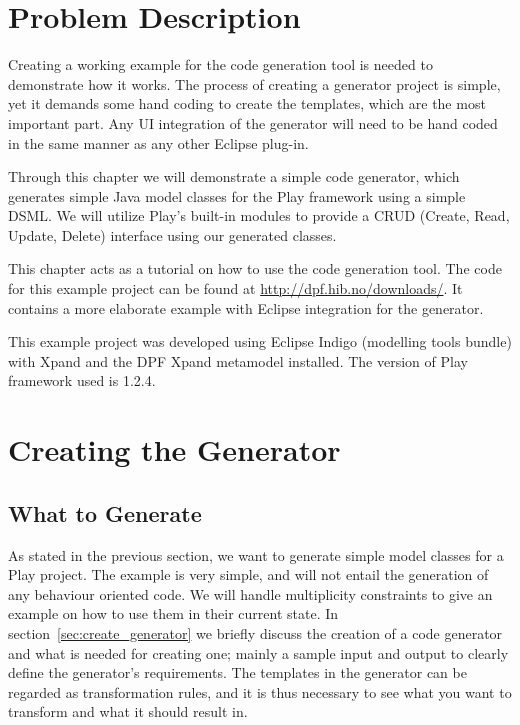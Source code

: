 \section{Problem Description}
Creating a working example for the code generation tool is needed to demonstrate how it works. The process of creating a generator project is simple, yet it demands some hand coding to create the templates, which are the most important part. Any UI integration of the generator will need to be hand coded in the same manner as any other Eclipse plug-in.

Through this chapter we will demonstrate a simple code generator, which generates simple Java model classes for the Play framework using a simple DSML. We will utilize Play's built-in modules to provide a CRUD (Create, Read, Update, Delete) interface using our generated classes. 

This chapter acts as a tutorial on how to use the code generation tool. The code for this example project can be found at \url{http://dpf.hib.no/downloads/}. It contains a more elaborate example with Eclipse integration for the generator. 

This example project was developed using Eclipse Indigo (modelling tools bundle) with Xpand and the DPF Xpand metamodel installed. The version of Play framework used is 1.2.4.


\section{Creating the Generator}
\subsection{What to Generate}
As stated in the previous section, we want to generate simple model classes for a Play project. The example is very simple, and will not entail the generation of any behaviour oriented code. We will handle multiplicity constraints to give an example on how to use them in their current state. In section~\ref{sec:create_generator} we briefly discuss the creation of a code generator and what is needed for creating one; mainly a sample input and output to clearly define the generator's requirements. The templates in the generator can be regarded as transformation rules, and it is thus necessary to see what you want to transform and what it should result in.

